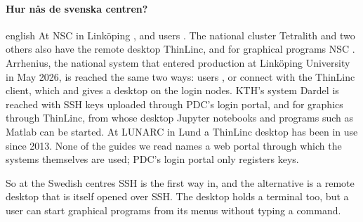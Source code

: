 \paragraph{%
  {Hur nås de svenska centren?}} %
\begin{onlyin}{english} %
At NSC in Linköping , and users
.  The
national cluster Tetralith and two others also have the remote desktop
ThinLinc, and for graphical programs NSC
.
Arrhenius, the national system that entered production at Linköping
University in May 2026\autocite{NAISSArrhenius2026}, is reached the same
two ways: users , or connect with the
ThinLinc client\autocite{NAISSArrheniusQuickstart2026}, which
 and gives a desktop on the login nodes.  KTH's system
Dardel is reached with SSH keys uploaded through PDC's login
portal\autocite{PDCSSHLogin2026,NAISSDardelQuickstart2026}, and for
graphics through ThinLinc, from whose desktop Jupyter notebooks and
programs such as Matlab can be started\autocite{PDCInteractive2026}.  At
LUNARC in Lund a ThinLinc desktop has been in use since
2013\autocite{Lindemann2024LUNARC}.  None of the guides we read names a
web portal through which the systems themselves are used; PDC's login
portal only registers keys.

So at the Swedish centres SSH is the first way in, and the alternative is
a remote desktop that is itself opened over SSH.  The desktop holds a
terminal too\autocite{NAISSArrheniusThinLinc2026,PDCInteractive2026}, but
a user can start graphical programs from its menus without typing a
command.
\end{onlyin}
